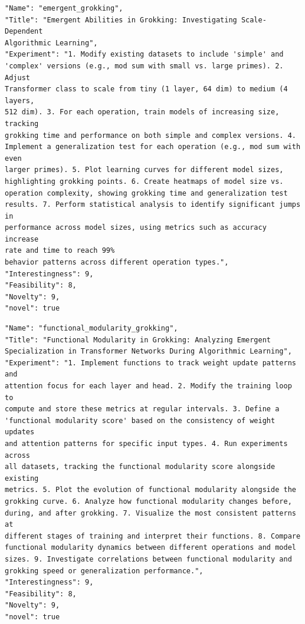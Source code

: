 \documentclass[11pt, a4paper]{include/gdm_format}
\begin{document}
\begin{tcolorbox}[breakable,colback=blue!5!white, colframe=blue!75!black, title=Idea 29/50 - \texttt{emergent\_grokking}]
\small
\begin{verbatim}
"Name": "emergent_grokking",
"Title": "Emergent Abilities in Grokking: Investigating Scale-Dependent
Algorithmic Learning",
"Experiment": "1. Modify existing datasets to include 'simple' and
'complex' versions (e.g., mod sum with small vs. large primes). 2. Adjust
Transformer class to scale from tiny (1 layer, 64 dim) to medium (4 layers,
512 dim). 3. For each operation, train models of increasing size, tracking
grokking time and performance on both simple and complex versions. 4.
Implement a generalization test for each operation (e.g., mod sum with even
larger primes). 5. Plot learning curves for different model sizes,
highlighting grokking points. 6. Create heatmaps of model size vs.
operation complexity, showing grokking time and generalization test
results. 7. Perform statistical analysis to identify significant jumps in
performance across model sizes, using metrics such as accuracy increase
rate and time to reach 99%
behavior patterns across different operation types.",
"Interestingness": 9,
"Feasibility": 8,
"Novelty": 9,
"novel": true
\end{verbatim}
\end{tcolorbox}

\begin{tcolorbox}[breakable,colback=blue!5!white, colframe=blue!75!black, title=Idea 30/50 - \texttt{functional\_modularity\_grokking}]
\small
\begin{verbatim}
"Name": "functional_modularity_grokking",
"Title": "Functional Modularity in Grokking: Analyzing Emergent
Specialization in Transformer Networks During Algorithmic Learning",
"Experiment": "1. Implement functions to track weight update patterns and
attention focus for each layer and head. 2. Modify the training loop to
compute and store these metrics at regular intervals. 3. Define a
'functional modularity score' based on the consistency of weight updates
and attention patterns for specific input types. 4. Run experiments across
all datasets, tracking the functional modularity score alongside existing
metrics. 5. Plot the evolution of functional modularity alongside the
grokking curve. 6. Analyze how functional modularity changes before,
during, and after grokking. 7. Visualize the most consistent patterns at
different stages of training and interpret their functions. 8. Compare
functional modularity dynamics between different operations and model
sizes. 9. Investigate correlations between functional modularity and
grokking speed or generalization performance.",
"Interestingness": 9,
"Feasibility": 8,
"Novelty": 9,
"novel": true
\end{verbatim}
\end{tcolorbox}
\end{document}
